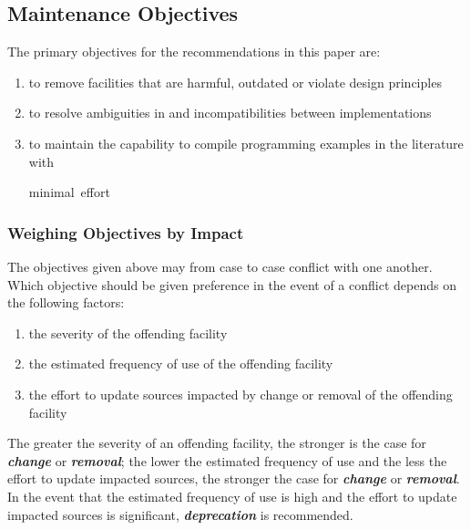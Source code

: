 \documentclass[10pt,a4paper]{article}
\renewcommand{\emph}[1]{\textbf{\textit{#1}}}
\begin{document}
\subsection{Maintenance Objectives}

The primary objectives for the recommendations in this paper are:

\renewcommand{\labelenumi}{(\arabic{enumi})}
\begin{enumerate}[leftmargin=!, labelindent=-0.75em, itemindent=0em]
\item to remove facilities that are harmful, outdated or violate design
principles
\item to resolve ambiguities in \cite{Wirth88} and incompatibilities between
implementations
\item to maintain the capability to compile programming examples in the
literature with \raggedright{minimal~effort}
\end{enumerate}

\subsubsection{Weighing Objectives by Impact}

\noindent The objectives given above may from case to case conflict with one
another. Which objective should be given preference in the event of a conflict
depends on the following factors:

\begin{enumerate}[itemindent=-0.75em]
\item the severity of the \gls{offending facility}
\item the estimated frequency of use of the \gls{offending facility}
\item the effort to update sources impacted by change or removal of the
\gls{offending facility}
\end{enumerate}

\noindent The greater the severity of an \gls{offending facility}, the stronger
is the case for \emph{change} or \emph{removal}; the lower the estimated
frequency of use and the less the effort to update impacted sources, the
stronger the case for \emph{change} or \emph{removal}. In the event that
the estimated frequency of use is high and the effort to update impacted
sources is significant, \emph{deprecation} is recommended.
\end{document}
